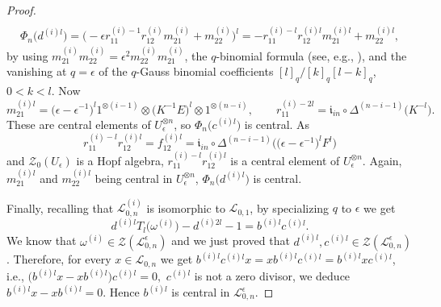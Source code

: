 \documentclass[pdftex]{sigma}%
\numberwithin{equation}{section}
\numberwithin{figure}{section}
\newcommand{\Ll}{{\mathcal L}}
\begin{document}
\begin{proof}
\begin{gather}
\\
\Phi_n\big(d^{(i)l}\big) = \big({-}\epsilon r_{11}^{(i)-1}r_{12}^{(i)}m_{21}^{(i)} + m_{22}^{(i)}\big)^l = -r_{11}^{(i)-l}r_{12}^{(i)l}m_{21}^{(i)l} + m_{22}^{(i)l},\label{Phindl}
\end{gather}
by using $m_{21}^{(i)}m_{22}^{(i)} = \epsilon^2 m_{22}^{(i)}m_{21}^{(i)}$, the $q$-binomial formula (see, e.g., \cite[Proposition IV.2.2]{Kas}), and the vanishing at $q=\epsilon$ of the $q$-Gauss binomial coefficients $[l]_q/[k]_q[l-k]_q$, $0< k< l$. Now
\[
m_{21}^{(i)l}= \big(\epsilon-\epsilon^{-1}\big)^l1^{\otimes (i-1)} \otimes \big(K^{-1}E\big) ^l \otimes 1^{\otimes (n-i)},\qquad
r_{11}^{(i)-2l}= \mathfrak{i}_{in}\circ \Delta^{(n-i-1)}\big(K^{-l}\big).
\]
These are central elements of $U_\epsilon^{\otimes n}$, so $\Phi_n\big(c^{(i)l}\big)$ is central. As
\[
r_{11}^{(i)-l}r_{12}^{(i)l}=f_{12}^{(i)l }= \mathfrak{i}_{in}\circ \Delta^{(n-i-1)}\big(\big(\epsilon-\epsilon^{-1}\big)^l F^l\big)
\]
and $\mathcal{Z}_0(U_\epsilon)$ is a Hopf algebra, $r_{11}^{(i)-l}
r_{12}^{(i)l}$ is a central element of
$U_\epsilon^{\otimes n}$. Again, $m_{21}^{(i)l}$ and $m_{22}^{(i)l}$ being central in $U_\epsilon^{\otimes n}$, $\Phi_n\big(d^{(i)l}\big)$ is central.

Finally, recalling that $\Ll_{0,n}^{(i)}$ is isomorphic to $\Ll_{0,1}$, by specializing $q$ to $\epsilon$ we get
\begin{equation}\label{relcentreomega}
d^{(i)l} T_l\big(\omega^{(i)}\big) - d^{(i)2l} - 1 = b^{(i)l}c^{(i)l}.
\end{equation}
We know that $\omega^{(i)}\in \mathcal{Z}(\Ll_{0,n}^\epsilon)$ and we just proved that $d^{(i)l}, c^{(i)l}\in \mathcal{Z}(\Ll_{0,n}^\epsilon)$. Therefore, for every $x\in \Ll_{0,n}$ we get $b^{(i)l}c^{(i)l} x = x b^{(i)l}c^{(i)l}=b^{(i)l} x c^{(i)l}$, i.e., $\big(b^{(i)l} x - x b^{(i)l}\big) c^{(i)l} = 0, $ $c^{(i)l}$ is not a zero divisor, we deduce $b^{(i)l} x - x b^{(i)l}=0$. Hence $b^{(i)l}$ is central in $\Ll_{0,n}^\epsilon$.


\end{proof}
\end{document}
